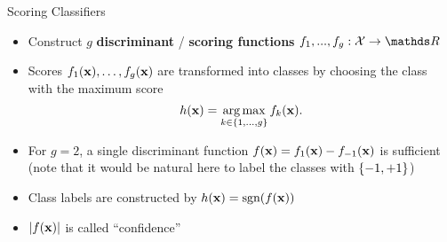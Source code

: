 \documentclass[11pt,compress,t,notes=noshow, xcolor=table]{beamer}
\begin{document}
\begin{vbframe}{Scoring Classifiers}
\begin{itemize}
\item Construct $g$ \textbf{discriminant} / \textbf{scoring functions} $f_1, ..., f_g: \Xspace \to \R$
\item Scores $f_1(\xv), \ldots, \fkx[g]$ are transformed into classes by choosing the class with the maximum score 
$$
h(\xv) = \argmax_{k \in \gset} \fkx[k]. 
$$ 

\item For $g = 2$, a single discriminant function $\fx = f_{1}(\xv) - f_{-1}(\xv)$ is sufficient (note that it would be natural here to label the classes with $\setmp$)  


\item Class labels are constructed by $\hx = \text{sgn}(\fx)$
\item $|\fx|$ is called \enquote{confidence}
\end{itemize}
\end{vbframe}
\end{document}
